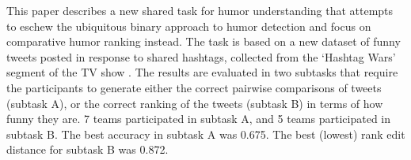 This paper describes a new shared task for humor understanding that attempts to eschew the ubiquitous binary approach to humor detection and focus on comparative humor ranking instead. The task is based on a new dataset of funny tweets posted in response to shared hashtags, collected from the `Hashtag Wars' segment of the TV show \@midnight. The results are evaluated in two subtasks that require the participants to generate either the correct pairwise comparisons of tweets (subtask A), or the correct ranking of the tweets (subtask B) in terms of how funny they are. 7 teams participated in subtask A, and 5 teams participated in subtask B. The best accuracy in subtask A was 0.675. The best (lowest) rank edit distance for subtask B was 0.872.
